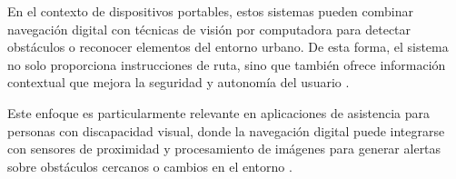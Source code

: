 En el contexto de dispositivos portables, estos sistemas pueden combinar navegación digital con técnicas de visión por computadora para detectar obstáculos o reconocer elementos del entorno urbano. De esta forma, el sistema no solo proporciona instrucciones de ruta, sino que también ofrece información contextual que mejora la seguridad y autonomía del usuario \cite{pmc_assistive_systems}.

Este enfoque es particularmente relevante en aplicaciones de asistencia para personas con discapacidad visual, donde la navegación digital puede integrarse con sensores de proximidad y procesamiento de imágenes para generar alertas sobre obstáculos cercanos o cambios en el entorno \cite{pmc_assistive_systems}.